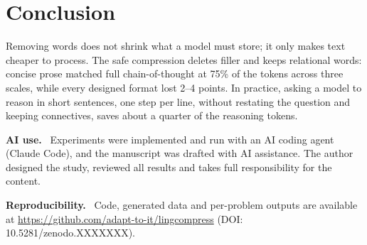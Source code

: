 \documentclass[10pt,a4paper,twocolumn]{article}
\renewcommand{\paragraph}[1]{\par\textbf{#1}\ }
\begin{document}
\section{Conclusion}
Removing words does not shrink what a model must store; it only makes text cheaper to process. The safe compression deletes filler and keeps relational words: concise prose matched full chain-of-thought at 75\% of the tokens across three scales, while every designed format lost 2--4 points. In practice, asking a model to reason in short sentences, one step per line, without restating the question and keeping connectives, saves about a quarter of the reasoning tokens.

\paragraph{AI use.} Experiments were implemented and run with an AI coding agent (Claude Code), and the manuscript was drafted with AI assistance. The author designed the study, reviewed all results and takes full responsibility for the content.
\paragraph{Reproducibility.} Code, generated data and per-problem outputs are available at \url{https://github.com/adapt-to-it/lingcompress} (DOI: 10.5281/zenodo.XXXXXXX).
\end{document}
